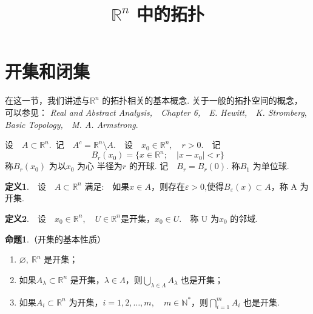 \documentclass{article}
\title{\(\mathbb{R}^n\) 中的拓扑}
\author{}
\date{}
\begin{document}
\maketitle

\section{开集和闭集}
\noindent 在这一节，我们讲述与\(\mathbb{R}^n\) 的拓扑相关的基本概念. 关于一般的拓扑空间的概念，可以参见：\newline
\textit{Real and Abstract Analysis,\ \ Chapter 6,\ \ E. Hewitt,\ \ K. Stromberg},\newline
\textit{Basic Topology,\ \ M. A. Armstrong}.

\vspace{30pt}

\noindent 设\ \ \(A  \subset \mathbb{R}^n\).\ 记\ \ \(A^{c} = \mathbb{R}^n\setminus A\).\ \ 设\ \ \(x_0 \in \mathbb{R}^n,\quad r > 0\).\ \ 记
\begin{equation*}
    B_r(x_0) = \{x \in \mathbb{R}^n;\quad | x - x_0 |< r \}
\end{equation*}
称\(B_r(x_0)\) 为以\(x_0\) 为心 半径为\(r\) 的开球. 记\ \ \(B_r = B_r(0)\). 称\(B_1\) 为单位球.

\vspace{30pt}

\noindent \textbf{定义1}.\ \ 设\ \ \(A  \subset \mathbb{R}^n\) 满足:\ \ 如果\(x \in A\)，则存在\(\varepsilon > 0\),使得\(B_{\varepsilon }(x) \subset A\)，称 A 为开集.

\vspace{30pt}

\noindent \textbf{定义2}.\ \ 设\ \ \(x_0 \in \mathbb{R}^n,\quad U \in \mathbb{R}^n\)是开集，\(x_0 \in U\).\ \ 称 U 为\(x_0\) 的邻域.

\newpage

\noindent \textbf{命题1}.（开集的基本性质）
\begin{enumerate}
    \item \(\varnothing ,\ \mathbb{R}^n\) 是开集；
    \item 如果\(A_{\lambda } \subset \mathbb{R}^n\) 是开集，\(\lambda \in \Lambda \)，则\( \displaystyle\bigcup_{\lambda \in \Lambda }A_{\lambda }\) 也是开集；
    \item 如果\(A_i  \subset \mathbb{R}^n\) 为开集，\(i = 1,2,\dots ,m,\quad m \in \mathbb{N}^{*}\)，则\( \displaystyle\bigcap_{i = 1}^{m}A_i\) 也是开集.
\end{enumerate}
\end{document}
